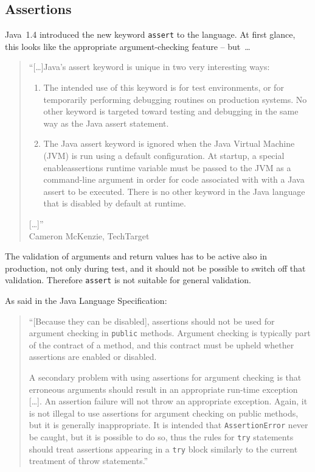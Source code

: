 \documentclass[11pt,a4paper, titlepage, parskip=half, headsepline, footsepline, cleardoublepage=current, headheight=1cm]{scrbook}
\begin{document}

\subsection{Assertions}\label{sec:Assertions}
Java~1.4 introduced the new keyword \lstinline|assert|\autocite{ORACLE_DOC_LANGUAGE_SPECIFICATION:Assert} to the language. At first glance, this looks like the appropriate argument-checking feature – but~… 
\begin{quotation}
“[…]Java's assert keyword is unique in two very interesting ways:

\begin{enumerate}
\item{The intended use of this keyword is for test environments, or for temporarily performing debugging routines on production systems. No other keyword is targeted toward testing and debugging in the same way as the Java assert statement.}
\item{The Java assert keyword is ignored when the Java Virtual Machine (JVM) is run using a default configuration. At startup, a special enableassertions runtime variable must be passed to the JVM as a command-line argument in order for code associated with with a Java assert to be executed. There is no other keyword in the Java language that is disabled by default at runtime.}
\end{enumerate}
[…]”\\ Cameron McKenzie, TechTarget\autocite{SERVERSIDE:JavaAssert}
\end{quotation}

The validation of arguments and return values has to be active also in production, not only during test, and it should not be possible to switch off that validation. Therefore \lstinline|assert| is not suitable for general validation. 

As said in the Java Language Specification\autocite{ORACLE_DOC_LANGUAGE_SPECIFICATION:Assert}:
\begin{quotation}
“[Because they can be disabled], assertions should not be used for argument checking in \lstinline|public| methods. Argument checking is typically part of the contract of a method, and this contract must be upheld whether assertions are enabled or disabled.

A secondary problem with using assertions for argument checking is that erroneous arguments should result in an appropriate run-time exception […]. An assertion failure will not throw an appropriate exception. Again, it is not illegal to use assertions for argument checking on public methods, but it is generally inappropriate. It is intended that \lstinline|AssertionError| never be caught, but it is possible to do so, thus the rules for \lstinline|try| statements should treat assertions appearing in a \lstinline|try| block similarly to the current treatment of throw statements.”
\end{quotation}
\end{document}
